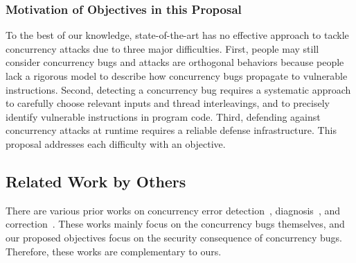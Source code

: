 \vspace{-.15in}\subsubsection{Motivation of Objectives in this Proposal} 
\label{sec:out-study}\vspace{-.075in}

To the best of our knowledge, state-of-the-art has no effective approach to 
tackle concurrency attacks due to three major difficulties.  First, 
people may still consider concurrency bugs and attacks are orthogonal 
behaviors because people lack a rigorous model to describe how concurrency bugs 
propagate to vulnerable instructions. Second, detecting a concurrency bug 
requires a systematic approach to carefully choose relevant inputs and thread 
interleavings, and to precisely identify vulnerable instructions in program 
code. Third, defending against concurrency attacks at runtime requires a 
reliable defense infrastructure. This proposal addresses each difficulty with 
an objective.





\vspace{-.15in}\subsection{Related Work by Others} 
\label{sec:others-work}\vspace{-.075in}

 There are various prior works on concurrency error 
detection~\cite{yu:racetrack:sosp,savage:eraser,racerx:sosp03,lu:muvi:sosp,
avio:asplos06,conmem:asplos10}, diagnosis~\cite{racefuzzer:pldi08,
ctrigger:asplos09,atomfuzzer:fse08}, 
and correction~\cite{dimmunix:osdi08,gadara:osdi08,wu:loom:osdi10,cfix:osdi12}. 
These works mainly focus on the concurrency bugs themselves, and our
proposed objectives focus on the security consequence of concurrency 
bugs. Therefore, these works are complementary to ours.

